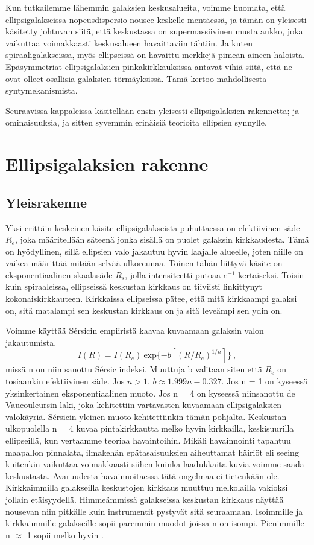 \documentclass[12pt,a4paper]{article}
\begin{document}
Kun tutkailemme lähemmin galaksien keskusalueita, voimme huomata, että ellipsigalakseissa nopeusdispersio nousee keskelle mentäessä, ja tämän on yleisesti käsitetty johtuvan siitä, että keskustassa on supermassiivinen musta aukko, joka vaikuttaa voimakkaasti keskusalueen havaittaviin tähtiin. Ja kuten spiraaligalakseissa, myös ellipseissä on havaittu merkkejä pimeän aineen haloista. Epäsymmetriat ellipsigalaksien pinkakirkkauksissa antavat vihiä siitä, että ne ovat olleet osallisia galaksien törmäyksissä. Tämä kertoo mahdollisesta syntymekanismista.

Seuraavissa kappaleissa käsitellään ensin yleisesti ellipsigalaksien rakennetta; ja ominaisuuksia, ja sitten syvemmin erinäisiä teorioita ellipsien synnylle.

\section{Ellipsigalaksien rakenne}

\subsection{Yleisrakenne}
Yksi erittäin keskeinen käsite ellipsigalakseista puhuttaessa on efektiivinen säde $R_e$, joka määritellään säteenä jonka sisällä on puolet galaksin kirkkaudesta. Tämä on hyödyllinen, sillä ellipsien valo jakautuu hyvin laajalle alueelle, joten niille on vaikea määrittää mitään selvää ulkoreunaa. Toinen tähän liittyvä käsite on eksponentiaalinen skaalasäde $R_s$, jolla intensiteetti putoaa $e^{-1}$-kertaiseksi. Toisin kuin spiraaleissa, ellipseissä keskustan kirkkaus on tiiviisti linkittynyt kokonaiskirkkauteen. Kirkkaissa ellipseissa pätee, että mitä kirkkaampi galaksi on, sitä matalampi sen keskustan kirkkaus on ja sitä leveämpi sen ydin on.

Voimme käyttää Sérsicin empiiristä kaavaa kuvaamaan galaksin valon jakautumista.
\begin{equation}
I(R) = I(R_e) \ \mathrm{exp}\{-b[(R/R_e)^{1/n}]\} \ ,
\end{equation}
missä n on niin sanottu Sérsic indeksi. Muuttuja b valitaan siten että $R_e$ on tosiaankin efektiivinen säde. Jos $n>1$, $b \approx 1.999n - 0.327$. Jos n = 1 on kyseessä yksinkertainen eksponentiaalinen muoto. Jos n = 4 on kyseessä niinsanottu de Vaucouleursin laki, joka kehitettiin vartavasten kuvaamaan ellipsigalaksien valokäyriä. Sérsicin yleinen muoto kehitettiinkin tämän pohjalta. Keskustan ulkopuolella n = 4 kuvaa pintakirkkautta melko hyvin kirkkailla, keskisuurilla ellipseillä, kun vertaamme teoriaa havaintoihin. Mikäli havainnointi tapahtuu maapallon pinnalata, ilmakehän epätasaisuuksien aiheuttamat häiriöt eli seeing kuitenkin vaikuttaa voimakkaasti siihen kuinka laadukkaita kuvia voimme saada keskustasta. Avaruudesta havainnoitaessa tätä ongelmaa ei tietenkään ole. Kirkkaimmilla galakseilla keskustojen kirkkaus muuttuu melkolailla vakioksi jollain etäisyydellä. Himmeämmissä galakseissa keskustan kirkkaus näyttää nousevan niin pitkälle kuin instrumentit pystyvät sitä seuraamaan. Isoimmille ja kirkkaimmille galakseille sopii paremmin muodot joissa n on isompi. Pienimmille n $\approx$ 1 sopii melko hyvin \citep{galaxies}.
\end{document}
